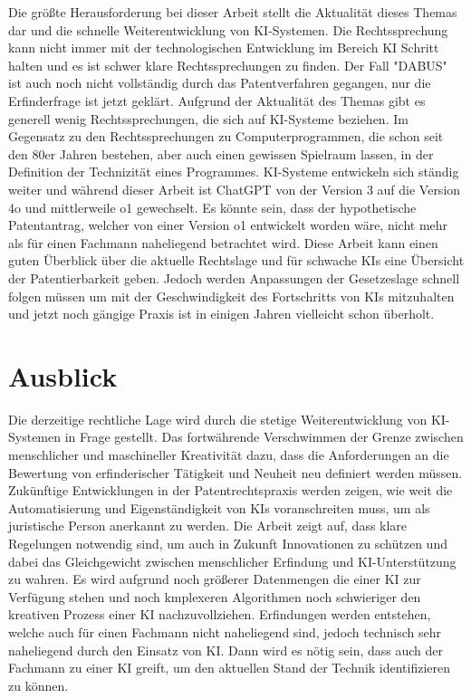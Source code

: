 Die größte Herausforderung bei dieser Arbeit stellt
die Aktualität dieses Themas dar und die 
schnelle Weiterentwicklung von KI-Systemen.
Die Rechtssprechung kann nicht immer mit der 
technologischen Entwicklung im Bereich KI
Schritt halten und es ist schwer
klare Rechtssprechungen zu finden. Der Fall
"DABUS" ist auch noch nicht vollständig durch das Patentverfahren
gegangen, nur die Erfinderfrage ist jetzt
geklärt. Aufgrund der Aktualität des Themas gibt
es generell wenig Rechtssprechungen, die sich auf
KI-Systeme beziehen. Im Gegensatz zu den Rechtssprechungen
zu Computerprogrammen, die schon seit den 80er Jahren
bestehen, aber auch einen gewissen Spielraum lassen,
in der Definition der Technizität eines Programmes. KI-Systeme
entwickeln sich ständig weiter und während dieser Arbeit 
ist ChatGPT von der Version 3 auf die Version 4o und mittlerweile
o1 gewechselt. Es könnte sein, dass der hypothetische
Patentantrag, welcher von einer Version o1 entwickelt 
worden wäre, nicht mehr als für
einen Fachmann naheliegend betrachtet wird. Diese Arbeit
kann einen guten Überblick über die aktuelle Rechtslage 
und für schwache KIs eine Übersicht der Patentierbarkeit geben.
Jedoch werden Anpassungen der Gesetzeslage schnell 
folgen müssen um mit der Geschwindigkeit des Fortschritts von
KIs mitzuhalten und jetzt noch gängige Praxis ist in 
einigen Jahren vielleicht schon überholt.

\section{Ausblick\label{sec:outlook}}

Die derzeitige rechtliche Lage wird durch die 
stetige Weiterentwicklung von KI-Systemen in Frage
gestellt. Das fortwährende Verschwimmen der 
Grenze zwischen menschlicher und maschineller Kreativität
dazu, dass die Anforderungen an die Bewertung von 
erfinderischer Tätigkeit und Neuheit neu definiert
werden müssen. 
Zukünftige Entwicklungen in der Patentrechtspraxis werden zeigen, 
wie weit die Automatisierung und Eigenständigkeit von KIs voranschreiten muss, 
um als juristische Person anerkannt zu werden. 
Die Arbeit zeigt auf, dass klare Regelungen notwendig sind, 
um auch in Zukunft Innovationen zu schützen 
und dabei das Gleichgewicht zwischen 
menschlicher Erfindung und KI-Unterstützung zu wahren.
Es wird aufgrund noch größerer Datenmengen die einer 
KI zur Verfügung stehen und noch kmplexeren Algorithmen
noch schwieriger den kreativen Prozess einer KI 
nachzuvollziehen. Erfindungen werden entstehen, welche
auch für einen Fachmann nicht naheliegend sind, jedoch 
technisch sehr naheliegend durch den Einsatz von KI.
Dann wird es nötig sein, dass auch der Fachmann zu einer
KI greift, um den aktuellen Stand der Technik identifizieren
zu können. 

